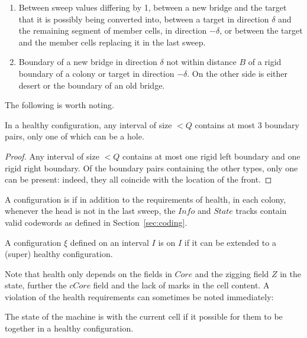 \documentclass[12pt]{memoir}
\newcommand{\fld}[1]{\ensuremath{\textit{#1}}}
\def\B{B}
\newcommand{\Z}{Z}
\newcommand{\Core}{\fld{Core}}
\newcommand{\cCore}{\fld{cCore}}
\newcommand{\Info}{\fld{Info}}
\newcommand{\State}{\fld{State}}
\begin{document}
\begin{enumerate}[(nr1)]
  \item\label{i:nonrigid.sweep} Between sweep values differing by 1,
between a new bridge and the target that it is possibly being converted into,
between a target in direction \( \delta \) and 
the remaining segment of member cells, in direction \( -\delta \),
or between the target and the member cells replacing it in the last sweep.

  \item\label{i:nonrigid.bridge-bridge} Boundary of a new bridge in direction \( \delta \)
not within distance \( \B \) of a rigid boundary of a colony or target in direction \( -\delta \).
On the other side is either desert or the boundary of an old bridge.

\end{enumerate}

The following is worth noting.

\begin{lemma}
In a healthy configuration, any interval of size \( <Q \) contains at most 3 boundary pairs,
only one of which can be  a hole.
\end{lemma}
\begin{proof}
Any interval of size \( <Q \) contains at most one rigid left boundary and
one rigid right boundary.
Of the boundary pairs containing the other
types, only one can be present: indeed, they all coincide with the location of the front.
\end{proof}


 \begin{definition}\label{def:super-healthy}
A configuration is   if in addition to the requirements of health, in each colony,
whenever the head is not in the last sweep,
the \( \Info \) and \( \State \) tracks contain valid codewords as
defined in Section~\ref{sec:coding}.

A configuration \( \xi \) defined on an interval \( I \) is  on \( I \) if 
it can be extended to a (super) healthy configuration.
 \end{definition}

Note that health only depends on the fields in \( \Core \) and
the zigging field \( \Z \) in the state, further the  \( \cCore \) field
and the lack of marks in the cell content.
A violation of the health requirements can sometimes be noted immediately:

\begin{definition}[Coordination] \label{def:coordinated}
   The state of the machine is  with the current cell
   if it possible for them to be together in a healthy configuration.
\end{definition}
\end{document}
